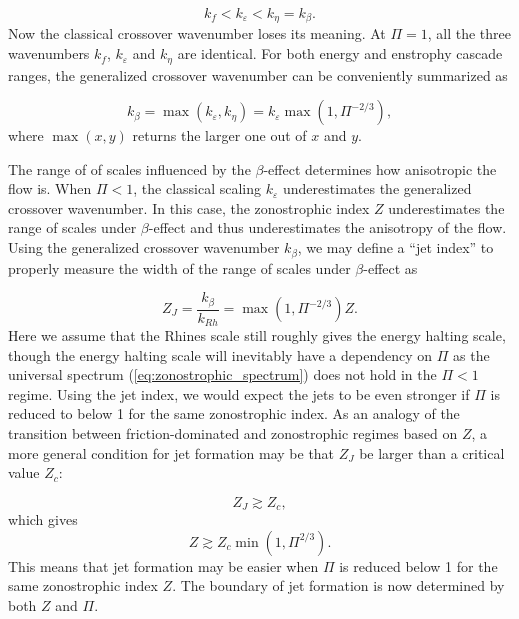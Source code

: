 \documentclass{ametsoc}
\begin{document}
\[
k_{f}<k_{\varepsilon}<k_{\eta}=k_{\beta}.
\]
Now the classical crossover wavenumber loses its meaning. At $\Pi=1$,
all the three wavenumbers $k_{f}$, $k_{\varepsilon}$ and $k_{\eta}$
are identical. For both energy and enstrophy cascade ranges, the
generalized crossover wavenumber can be conveniently summarized as

\begin{equation}
k_{\beta}=\max(k_{\varepsilon},k_{\eta})=k_{\varepsilon}\max(1,\Pi^{-2/3}),\label{eq:generalized_crossover_wavenumber}
\end{equation}
where $\max(x,y)$ returns the larger one out of $x$ and $y$. 

The range of of scales influenced by the $\beta$-effect determines
how anisotropic the flow is. When $\Pi<1$, the classical scaling
$k_{\varepsilon}$ underestimates the generalized crossover wavenumber.
In this case, the zonostrophic index $Z$ underestimates the range
of scales under $\beta$-effect and thus underestimates the anisotropy
of the flow. Using the generalized crossover wavenumber $k_{\beta}$,
we may define a ``jet index'' to properly measure the width of the
range of scales under $\beta$-effect as

\begin{equation}
Z_{J}=\frac{k_{\beta}}{k_{Rh}}=\max(1,\Pi^{-2/3})Z.\label{eq:jet index}
\end{equation}
Here we assume that the Rhines scale still roughly gives the energy
halting scale, though the energy halting scale will inevitably have a
dependency on $\Pi$ as the universal spectrum (\ref{eq:zonostrophic_spectrum})
does not hold in the $\Pi<1$ regime. Using the jet index, we would
expect the jets to be even stronger if $\Pi$ is reduced to below 1 for
the same zonostrophic index. As an analogy of the transition between
friction-dominated and zonostrophic regimes based on $Z$, a more
general condition for jet formation may be that $Z_{J}$ be larger than a
critical value $Z_{c}$:

\[
Z_{J}\apprge Z_{c},
\]
which gives
\[
Z\apprge Z_{c}\min(1,\Pi^{2/3}).
\]
This means that jet formation may be easier when $\Pi$ is reduced
below 1 for the same zonostrophic index $Z$. The boundary of jet
formation is now determined by both $Z$ and $\Pi$. 
\end{document}
